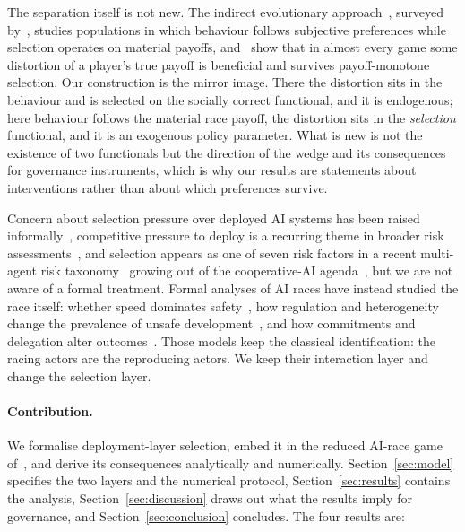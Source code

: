 \documentclass[11pt,a4paper]{article}
\theoremstyle{definition}
\begin{document}
The separation itself is not new. The indirect evolutionary approach~\citep{guth1992evolutionary,guth1995evolutionary,dekel2007evolution,alger2013homo},
surveyed by~\citet{alger2019preference},
studies populations in which behaviour follows subjective preferences while
selection operates on material payoffs, and~\citet{heifetz2007maximize} show
that in almost every game some distortion of a player's true payoff is
beneficial and survives payoff-monotone selection. Our construction is the
mirror image. There the distortion sits in the behaviour and is selected on
the socially correct functional, and it is endogenous; here behaviour follows
the material race payoff, the distortion sits in the \emph{selection}
functional, and it is an exogenous policy parameter. What is new is not the
existence of two functionals but the direction of the wedge and its
consequences for governance instruments, which is why our results are
statements about interventions rather than about which preferences survive.

Concern about selection pressure over deployed AI systems has been raised
informally~\citep{hendrycks2023natural}, competitive pressure to deploy is a
recurring theme in broader risk assessments~\citep{bengio2024managing}, and
selection appears as one of seven risk factors in a recent multi-agent risk
taxonomy~\citep{hammond2025multiagent} growing out of the cooperative-AI
agenda~\citep{dafoe2020open,dafoe2021cooperative}, but we are not aware of a
formal treatment.
Formal analyses of AI races have instead studied the race itself: whether
speed dominates safety~\citep{armstrong2016precipice}, how regulation and
heterogeneity change the prevalence of unsafe development~\citep{han2020regulate,cimpeanu2022heterogeneous}, and how commitments and
delegation alter outcomes~\citep{askell2019cooperation,domingos2022delegation,terrucha2024committing}.
Those models keep the classical identification: the racing actors are the
reproducing actors. We keep their interaction layer and change the selection
layer.

\paragraph{Contribution.}
We formalise deployment-layer selection, embed it in the reduced AI-race game
of~\citet{domingos2026falling}, and derive its consequences analytically and
numerically. Section~\ref{sec:model} specifies the two layers and the numerical protocol,
Section~\ref{sec:results} contains the analysis,
Section~\ref{sec:discussion} draws out what the results imply for
governance, and Section~\ref{sec:conclusion} concludes.
The four results are:
\end{document}
